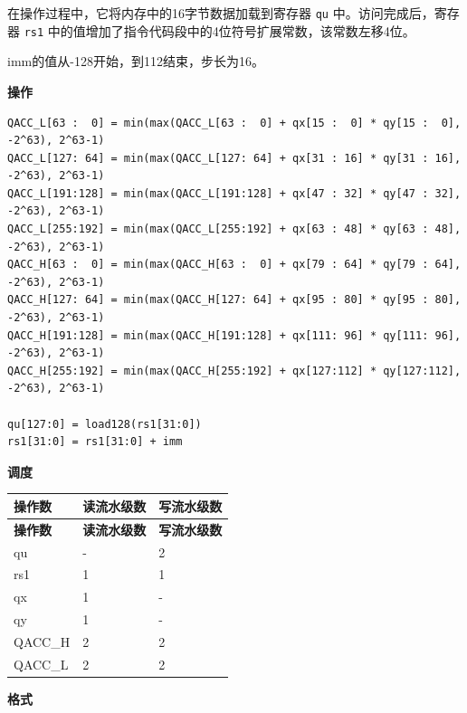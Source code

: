 在操作过程中，它将内存中的16字节数据加载到寄存器 \lstinline{qu} 中。访问完成后，寄存器 \lstinline{rs1} 中的值增加了指令代码段中的4位符号扩展常数，该常数左移4位。

imm的值从-128开始，到112结束，步长为16。

\textbf{操作}\\
\begin{lstlisting}
QACC_L[63 :  0] = min(max(QACC_L[63 :  0] + qx[15 :  0] * qy[15 :  0], -2^63), 2^63-1)
QACC_L[127: 64] = min(max(QACC_L[127: 64] + qx[31 : 16] * qy[31 : 16], -2^63), 2^63-1)
QACC_L[191:128] = min(max(QACC_L[191:128] + qx[47 : 32] * qy[47 : 32], -2^63), 2^63-1)
QACC_L[255:192] = min(max(QACC_L[255:192] + qx[63 : 48] * qy[63 : 48], -2^63), 2^63-1)
QACC_H[63 :  0] = min(max(QACC_H[63 :  0] + qx[79 : 64] * qy[79 : 64], -2^63), 2^63-1)
QACC_H[127: 64] = min(max(QACC_H[127: 64] + qx[95 : 80] * qy[95 : 80], -2^63), 2^63-1)
QACC_H[191:128] = min(max(QACC_H[191:128] + qx[111: 96] * qy[111: 96], -2^63), 2^63-1)
QACC_H[255:192] = min(max(QACC_H[255:192] + qx[127:112] * qy[127:112], -2^63), 2^63-1)

qu[127:0] = load128(rs1[31:0])
rs1[31:0] = rs1[31:0] + imm
\end{lstlisting}

\textbf{调度}\\
\begin{longtable}[c]{|l|l|l|}
    \hline
    \rowcolor{lightgray}
    \textbf{操作数} & \textbf{读流水级数} & \textbf{写流水级数} \\\hline
    \endfirsthead
    \hline
    \rowcolor{lightgray}
     \textbf{操作数} & \textbf{读流水级数} & \textbf{写流水级数} \\\hline
    \endhead
    \hline
    \endfoot

    qu & - & 2 \\\hline
    rs1 & 1 & 1 \\\hline
     qx & 1 & - \\\hline
     qy & 1 & - \\\hline
     QACC\_H & 2 & 2 \\\hline
     QACC\_L & 2 & 2

\end{longtable}

\textbf{格式}\\

